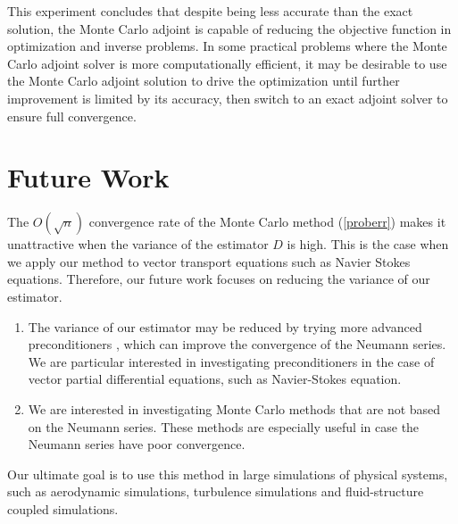 \documentclass{elsart}
\theoremstyle{remark}
\theoremstyle{definition}
\theoremstyle{proof}
\begin{document}
        This experiment concludes that despite being less accurate than
        the exact solution, the Monte Carlo adjoint is capable of reducing
        the objective function in optimization and inverse problems.
        In some practical problems where the Monte Carlo adjoint solver is
        more computationally efficient, it may be desirable to use the Monte
        Carlo adjoint solution to drive the optimization until further
        improvement is limited by its accuracy, then switch to an exact
        adjoint solver to ensure full convergence.





\section{Future Work}
    The $O(\sqrt{n})$ convergence rate of the Monte Carlo method
    (\ref{proberr}) makes it unattractive when the variance of the estimator
    $D$ is high.  This is the case when we apply our method to vector
    transport equations such as Navier Stokes equations.  Therefore, our
    future work focuses on reducing the variance of our estimator.
    \begin{enumerate}
    \item The variance of our estimator may be reduced by trying more
          advanced preconditioners \cite{Tan2002} \cite{Srinivasan2003}, which
          can improve the convergence of the Neumann series.  We are particular
          interested in investigating preconditioners in the case of vector
          partial differential equations, such as Navier-Stokes equation.
    \item We are interested in investigating Monte Carlo methods that are not
          based on the Neumann series.  These methods are especially useful
          in case the Neumann series have poor convergence.
    \end{enumerate}
    Our ultimate goal is to use this method in large simulations of physical
    systems, such as aerodynamic simulations, turbulence simulations and
    fluid-structure coupled simulations.
\end{document}
